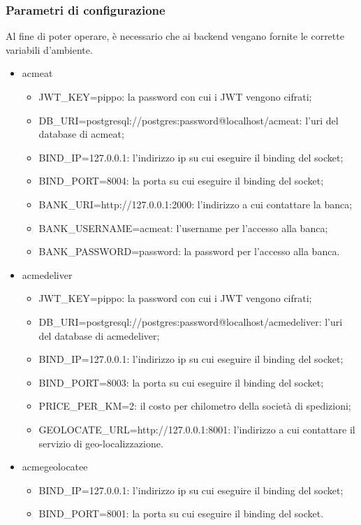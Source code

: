 \documentclass[11pt]{article} %
\begin{document}
\subsubsection{Parametri di configurazione}

Al fine di poter operare, è necessario che ai backend vengano fornite le corrette variabili d'ambiente.
\begin{itemize}
\item acmeat
\begin{itemize}
\item JWT\_KEY=pippo: la password con cui i JWT vengono cifrati;
\item DB\_URI=postgresql://postgres:password@localhost/acmeat: l'uri del database di acmeat;
\item BIND\_IP=127.0.0.1: l'indirizzo ip su cui eseguire il binding del socket;
\item BIND\_PORT=8004: la porta su cui eseguire il binding del socket;
\item BANK\_URI=http://127.0.0.1:2000: l'indirizzo a cui contattare la banca;
\item BANK\_USERNAME=acmeat: l'username per l'accesso alla banca;
\item BANK\_PASSWORD=password: la password per l'accesso alla banca.
\end{itemize}
\item acmedeliver
\begin{itemize}
\item JWT\_KEY=pippo: la password con cui i JWT vengono cifrati;
\item DB\_URI=postgresql://postgres:password@localhost/acmedeliver: l'uri del database di acmedeliver;
\item BIND\_IP=127.0.0.1: l'indirizzo ip su cui eseguire il binding del socket;
\item BIND\_PORT=8003: la porta su cui eseguire il binding del socket;
\item PRICE\_PER\_KM=2: il costo per chilometro della società di spedizioni;
\item GEOLOCATE\_URL=http://127.0.0.1:8001: l'indirizzo a cui contattare il servizio di geo-localizzazione.
\end{itemize}
\item acmegeolocatee
\begin{itemize}
\item BIND\_IP=127.0.0.1: l'indirizzo ip su cui eseguire il binding del socket;
\item BIND\_PORT=8001: la porta su cui eseguire il binding del socket.

\end{itemize}
\end{itemize}
\end{document}
